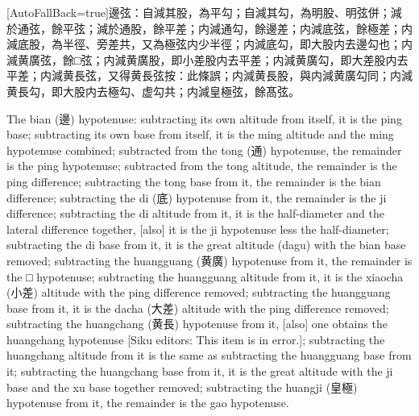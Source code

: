 \documentclass[11pt]{article}
\newcommand{\zhsmall}{\footnotesize\color{black!70}}
\newcommand{\unitlabel}[1]{\marginpar{\raggedleft\tiny\color{gray}#1}}
\newenvironment{unitzh}{\par\CJKfontspec{Noto Serif CJK SC}[AutoFallBack=true]\large\linespread{1.25}\selectfont}{\par}
\newenvironment{uniten}{\par\small\color{black!85}}{\par\medskip}
\begin{document}
\begin{unitzh}\unitlabel{ceyuan-005.8}邊弦：自減其股，為平勾；自減其勾，為明股、明弦併；減於通弦，餘平弦；減於通股，餘平差；内減通勾，餘邊差；内減底弦，餘極差；内減底股，為半徑、旁差共，{\zhsmall 又}為極弦内少半徑；内減底勾，即大股内去邊勾也；内減黄廣弦，餘□弦；内減黄廣股，即小差股内去平差；内減黄廣勾，即大差股内去平差；内減黄長弦，{\zhsmall 又}得黄長弦{\zhsmall 按：此條誤}；内減黄長股，與内減黄廣勾同；内減黄長勾，即大股内去極勾、虚勾共；内減皇極弦，餘髙弦。\end{unitzh}
\begin{uniten}The bian (邊) hypotenuse: subtracting its own altitude from itself, it is the ping base; subtracting its own base from itself, it is the ming altitude and the ming hypotenuse combined; subtracted from the tong (通) hypotenuse, the remainder is the ping hypotenuse; subtracted from the tong altitude, the remainder is the ping difference; subtracting the tong base from it, the remainder is the bian difference; subtracting the di (底) hypotenuse from it, the remainder is the ji difference; subtracting the di altitude from it, it is the half-diameter and the lateral difference together, [also] it is the ji hypotenuse less the half-diameter; subtracting the di base from it, it is the great altitude (dagu) with the bian base removed; subtracting the huangguang (黄廣) hypotenuse from it, the remainder is the □ hypotenuse; subtracting the huangguang altitude from it, it is the xiaocha (小差) altitude with the ping difference removed; subtracting the huangguang base from it, it is the dacha (大差) altitude with the ping difference removed; subtracting the huangchang (黄長) hypotenuse from it, [also] one obtains the huangchang hypotenuse [Siku editors: This item is in error.]; subtracting the huangchang altitude from it is the same as subtracting the huangguang base from it; subtracting the huangchang base from it, it is the great altitude with the ji base and the xu base together removed; subtracting the huangji (皇極) hypotenuse from it, the remainder is the gao hypotenuse.\end{uniten}
\end{document}
